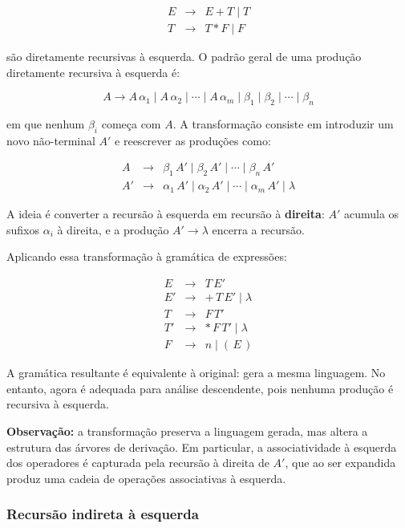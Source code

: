   \[
    \begin{array}{lcl}
      E & \to & E + T \mid T\\
      T & \to & T * F \mid F
    \end{array}
  \]

  são diretamente recursivas à esquerda. O padrão geral de uma produção
  diretamente recursiva à esquerda é:

  \[
    A \to A\,\alpha_1 \mid A\,\alpha_2 \mid \cdots \mid A\,\alpha_m
    \mid \beta_1 \mid \beta_2 \mid \cdots \mid \beta_n
  \]

  em que nenhum \(\beta_i\) começa com \(A\). A transformação consiste
  em introduzir um novo não-terminal \(A'\) e reescrever as produções como:

  \[
    \begin{array}{lcl}
      A  & \to & \beta_1\,A' \mid \beta_2\,A' \mid \cdots \mid \beta_n\,A'\\
      A' & \to & \alpha_1\,A' \mid \alpha_2\,A' \mid \cdots \mid
      \alpha_m\,A' \mid \lambda
    \end{array}
  \]

  A ideia é converter a recursão à esquerda em recursão à
  \textbf{direita}: \(A'\) acumula os sufixos \(\alpha_i\) à direita, e
  a produção \(A' \to \lambda\) encerra a recursão.

  Aplicando essa transformação à gramática de expressões:

  \[
    \begin{array}{lcl}
      E  & \to & T\,E'\\
      E' & \to & +\,T\,E' \mid \lambda\\
      T  & \to & F\,T'\\
      T' & \to & *\,F\,T' \mid \lambda\\
      F  & \to & n \mid (\,E\,)
    \end{array}
  \]

  A gramática resultante é equivalente à original: gera a mesma
  linguagem. No entanto, agora é adequada para análise descendente,
  pois nenhuma produção é recursiva à esquerda.

  \textbf{Observação:} a transformação preserva a linguagem gerada,
  mas altera a estrutura das árvores de derivação. Em particular, a
  associatividade à esquerda dos operadores é capturada pela recursão
  à direita de \(A'\), que ao ser expandida produz uma cadeia de
  operações associativas à esquerda.

  \subsubsection{Recursão indireta à esquerda}

